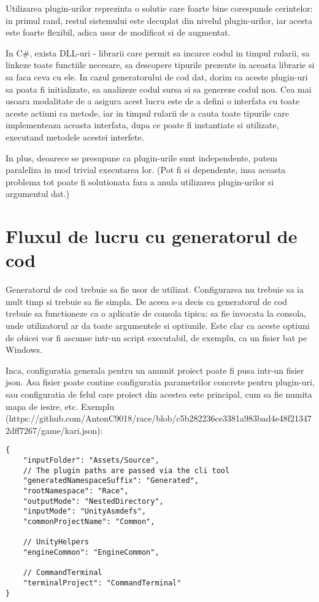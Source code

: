 \documentclass{report}
\begin{document}
Utilizarea plugin-urilor reprezinta o solutie care foarte bine
corespunde cerintelor: in primul rand, restul sistemului este decuplat
din nivelul plugin-urilor, iar acesta este foarte flexibil, adica usor
de modificat si de augmentat.

In C\#, exista DLL-uri - librarii care permit sa incarce codul in timpul
rularii, sa linkeze toate functiile necesare, sa descopere tipurile
prezente in aceasta librarie si sa faca ceva cu ele. In cazul
generatorului de cod dat, dorim ca aceste plugin-uri sa poata fi
initializate, sa analizeze codul sursa si sa genereze codul nou. Cea mai
usoara modalitate de a asigura acest lucru este de a defini o interfata
cu toate aceste actiuni ca metode, iar in timpul rularii de a cauta
toate tipurile care implementeaza aceasta interfata, dupa ce poate fi
instantiate si utilizate, executand metodele acestei interfete.

In plus, deoarece se presupune ca plugin-urile sunt independente, putem
paraleliza in mod trivial executarea lor. (Pot fi si dependente, insa
aceasta problema tot poate fi solutionata fara a anula utilizarea
plugin-urilor si argumentul dat.)

\section{Fluxul de lucru cu generatorul de cod}

Generatorul de cod trebuie sa fie usor de utilizat. Configurarea nu
trebuie sa ia mult timp si trebuie sa fie simpla. De aceea s-a decis ca
generatorul de cod trebuie sa functioneze ca o aplicatie de consola
tipica: sa fie invocata la consola, unde utilizatorul ar da toate
argumentele si optiunile. Este clar ca aceste optiuni de obicei vor fi
ascunse intr-un script executabil, de exemplu, ca un fisier bat pe
Windows.

Inca, configuratia generala pentru un anumit proiect poate fi pusa
intr-un fisier json. Asa fisier poate contine configuratia parametrilor
concrete pentru plugin-uri, sau configuratia de felul care proiect din
acestea este principal, cum sa fie numita mapa de iesire, etc. Exemplu
(https://github.com/AntonC9018/race/blob/c5b282236ce3381a983bad4e48f213472dff7267/game/kari.json):

\begin{lstlisting}
{
    "inputFolder": "Assets/Source",
    // The plugin paths are passed via the cli tool
    "generatedNamespaceSuffix": "Generated",
    "rootNamespace": "Race",
    "outputMode": "NestedDirectory",
    "inputMode": "UnityAsmdefs",
    "commonProjectName": "Common",

    // UnityHelpers
    "engineCommon": "EngineCommon",

    // CommandTerminal
    "terminalProject": "CommandTerminal"
}
\end{lstlisting}
\end{document}
